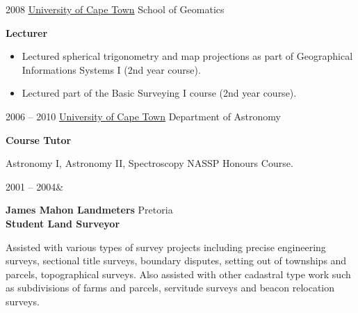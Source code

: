 \documentclass[]{friggeri-cv} %
\begin{document}
\begin{entrylist}
%
\entry
{2008}
{\href{http://www.uct.ac.za}{University of Cape Town}}
{School of Geomatics}
{%
\textbf{Lecturer}
\begin{itemize}
\setlength{\itemsep}{5pt}
    \item Lectured spherical trigonometry and map projections as part of Geographical Informations Systems I (2nd year course).
    \item Lectured part of the Basic Surveying I course (2nd year course).
\end{itemize}
}
\end{entrylist}
\begin{entrylist}
%
\entry
{2006 -- 2010}
{\href{http://www.uct.ac.za}{University of Cape Town}}
{Department of Astronomy}
{%
\textbf{Course Tutor}

Astronomy I, Astronomy II, Spectroscopy NASSP Honours Course.
}
%
\end{entrylist}
\renewcommand{\entry}[4]{%
  #1&\parbox[t]{13.5cm}{%
    \textbf{#2}%
    \hfill%
    {\footnotesize{} #3}\\%
    #4\vspace{3\parsep}%
  }\\}
\begin{entrylist}
\entry
{2001 -- 2004}
{\textcolor{maroonsblue}{James Mahon Landmeters}}
{Pretoria}
{%
\textbf{Student Land Surveyor}

Assisted with various types of survey projects including precise engineering surveys, sectional title surveys, boundary disputes, setting out of townships and parcels, topographical surveys. Also assisted with other cadastral type work such as subdivisions of farms and parcels, servitude surveys and beacon relocation surveys. 
}
\end{entrylist}


\end{document}
